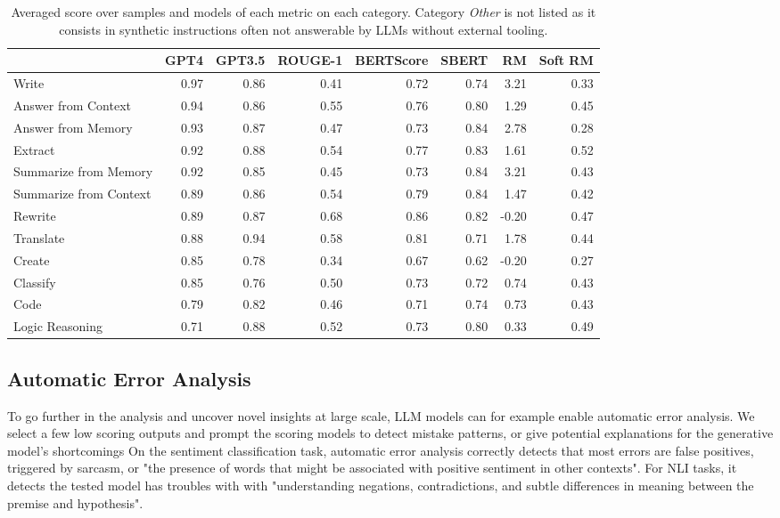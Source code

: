 \begin{table}
    \centering
    \begin{tabular}{lrrrrrrr}
        \toprule
         & GPT4 & GPT3.5 & ROUGE-1 & BERTScore & SBERT & RM & Soft RM \\
        \midrule
        Write & 0.97 & 0.86 & 0.41 & 0.72 & 0.74 & 3.21 & 0.33 \\
        Answer from Context & 0.94 & 0.86 & 0.55 & 0.76 & 0.80 & 1.29 & 0.45 \\
        Answer from Memory & 0.93 & 0.87 & 0.47 & 0.73 & 0.84 & 2.78 & 0.28 \\
        Extract & 0.92 & 0.88 & 0.54 & 0.77 & 0.83 & 1.61 & 0.52 \\
        Summarize from Memory & 0.92 & 0.85 & 0.45 & 0.73 & 0.84 & 3.21 & 0.43 \\
        Summarize from Context & 0.89 & 0.86 & 0.54 & 0.79 & 0.84 & 1.47 & 0.42 \\
        Rewrite & 0.89 & 0.87 & 0.68 & 0.86 & 0.82 & -0.20 & 0.47 \\
        Translate & 0.88 & 0.94 & 0.58 & 0.81 & 0.71 & 1.78 & 0.44 \\
        Create & 0.85 & 0.78 & 0.34 & 0.67 & 0.62 & -0.20 & 0.27 \\
        Classify & 0.85 & 0.76 & 0.50 & 0.73 & 0.72 & 0.74 & 0.43 \\
        Code & 0.79 & 0.82 & 0.46 & 0.71 & 0.74 & 0.73 & 0.43 \\
        Logic Reasoning & 0.71 & 0.88 & 0.52 & 0.73 & 0.80 & 0.33 & 0.49 \\
        \bottomrule
        \end{tabular}
    \caption[Averaged metric scores]{Averaged score over samples and models of each metric on each category. Category \textit{Other} is not listed as it  consists in synthetic instructions often not answerable by LLMs without external tooling.}
    \label{tab:exp1a}
\end{table}


\subsection{Automatic Error Analysis}

To go further in the analysis and uncover novel insights at large scale, LLM models can for example enable automatic error analysis. We select a few low scoring outputs and prompt the scoring models to detect mistake patterns, or give potential explanations for the generative model's shortcomings On the sentiment classification task, automatic error analysis correctly detects that most errors are false positives, triggered by sarcasm, or "the presence of words that might be associated with positive sentiment in other contexts". For NLI tasks, it detects the tested model has troubles with  with "understanding negations, contradictions, and subtle differences in meaning between the premise and hypothesis".

